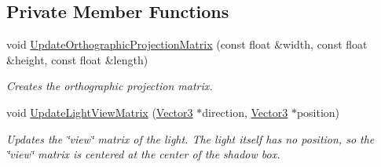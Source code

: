 \subsection*{Private Member Functions}
\begin{DoxyCompactItemize}
\item 
void \hyperlink{class_flounder_1_1_shadows_a2dc9f096db529ae923d5ca392c4d43a7}{Update\+Orthographic\+Projection\+Matrix} (const float \&width, const float \&height, const float \&length)
\begin{DoxyCompactList}\small\item\em Creates the orthographic projection matrix. \end{DoxyCompactList}\item 
void \hyperlink{class_flounder_1_1_shadows_ac9ec359e3f78dcfdcbfb09e244b89054}{Update\+Light\+View\+Matrix} (\hyperlink{class_flounder_1_1_vector3}{Vector3} $\ast$direction, \hyperlink{class_flounder_1_1_vector3}{Vector3} $\ast$position)
\begin{DoxyCompactList}\small\item\em Updates the \char`\"{}view\char`\"{} matrix of the light. The light itself has no position, so the \char`\"{}view\char`\"{} matrix is centered at the center of the shadow box. \end{DoxyCompactList}\end{DoxyCompactItemize}
